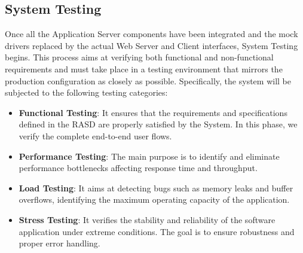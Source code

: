 \newpage
\subsection{System Testing}
Once all the Application Server components have been integrated and the mock drivers replaced by the actual Web Server and Client interfaces, System Testing begins. This process aims at verifying both functional and non-functional requirements and must take place in a testing environment that mirrors the production configuration as closely as possible. Specifically, the system will be subjected to the following testing categories:

\begin{itemize}
    \item \textbf{Functional Testing}: It ensures that the requirements and specifications defined in the RASD are properly satisfied by the System. In this phase, we verify the complete end-to-end user flows.
    \item \textbf{Performance Testing}: The main purpose is to identify and eliminate performance bottlenecks affecting response time and throughput.
    \item \textbf{Load Testing}: It aims at detecting bugs such as memory leaks and buffer overflows, identifying the maximum operating capacity of the application.
    \item \textbf{Stress Testing}: It verifies the stability and reliability of the software application under extreme conditions. The goal is to ensure robustness and proper error handling.
    
\end{itemize}






